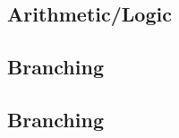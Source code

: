 \documentclass{note}\usepackage{mathptm,mydef}
\begin{document}
\subsection{Arithmetic/Logic}
\subsection{Branching}
\subsection{Branching}



%
%
\end{document}
